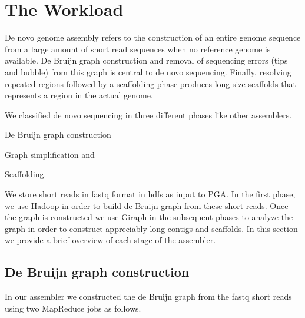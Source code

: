 \documentclass[conference]{IEEEtran}
\begin{document}

\section {The Workload} \label{TheWorkload}
De novo genome assembly refers to the construction of an entire genome sequence from a large amount of short read sequences when no reference genome is available. 
De Bruijn graph construction  and removal of sequencing errors (tips and bubble) from this graph is central to de novo sequencing. 
Finally, resolving  repeated regions followed by a scaffolding phase produces long size scaffolds that represents a region in the actual genome.

We classified de novo sequencing in three different phases like other assemblers.
\begin{inparaenum}
\item De Bruijn graph construction
\item Graph simplification and
\item Scaffolding.
\end{inparaenum}
We store short reads in fastq format in hdfs as input to PGA.
In the first phase, we use Hadoop in order to build de Bruijn graph from these short reads. 
Once the graph is constructed we use Giraph in the subsequent phases to analyze the graph in order to construct appreciably long contigs and scaffolds.
In this section we provide a brief overview of each stage of the assembler.

\subsection {De Bruijn graph construction}
In our assembler we constructed the de Bruijn graph from the fastq short reads using two MapReduce jobs as follows. 
\end{document}
